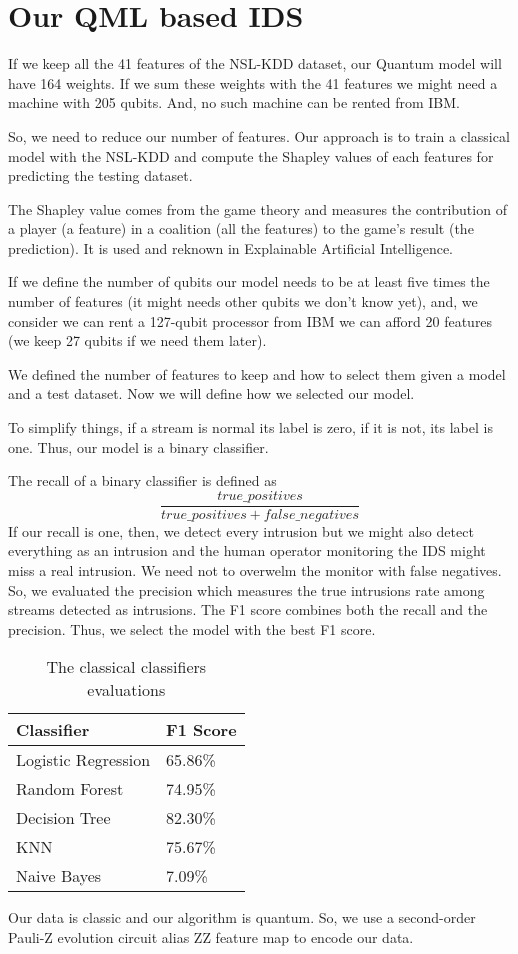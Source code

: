 \documentclass{article}
\begin{document}
\section{Our QML based IDS}
If we keep all the 41 features of the NSL-KDD dataset, our Quantum model will
have 164 weights. If we sum these weights with the 41 features we might need
a machine with 205 qubits. And, no such machine can be rented from IBM.\par
So, we need to reduce our number of features. Our approach is to train a
classical model with the NSL-KDD and compute the Shapley values of each
features for predicting the testing dataset.\par
The Shapley value comes from the game theory and measures the contribution of 
a player (a feature) in a coalition (all the features) to the game's result 
(the prediction). It is used and reknown in Explainable Artificial 
Intelligence.\par
If we define the number of qubits our model needs to be at least five times 
the number of features (it might needs other qubits we don't know yet), and, 
we consider we can rent a 127-qubit processor from IBM we can afford 20 
features (we keep 27 qubits if we need them later).\par
We defined the number of features to keep and how to select them given a model
and a test dataset. Now we will define how we selected our model.\par
To simplify things, if a stream is normal its label is zero, if it is not, its 
label is one. Thus, our model is a binary classifier.\par
The recall of a binary classifier is defined as
$$\frac{true\_positives}{true\_positives+false\_negatives}$$
If our recall is one, then, we detect every intrusion but we might also detect
everything as an intrusion and the human operator monitoring the IDS might miss
a real intrusion. We need not to overwelm the monitor with false negatives. 
So, we evaluated the precision which measures the true intrusions 
rate among streams detected as intrusions. The F1 score combines both the 
recall and the precision. Thus, we select the model with the best F1 score.\newline
\begin{table}[H]
\caption{The classical classifiers evaluations}
\label{f1score-classical-classifier}
\center
\begin{tabular}{|l|l|}
\hline
        Classifier & F1 Score \tabularnewline
        \hline
        Logistic Regression &  65.86\% \tabularnewline
        Random Forest & 74.95\% \tabularnewline
        Decision Tree & 82.30\% \tabularnewline
        KNN & 75.67\% \tabularnewline
        Naive Bayes & 7.09\% \tabularnewline
\hline
\end{tabular}
\end{table}
Our data is classic and our algorithm is quantum. So, we use a second-order 
Pauli-Z evolution circuit alias ZZ feature map to encode our data.
\end{document}
